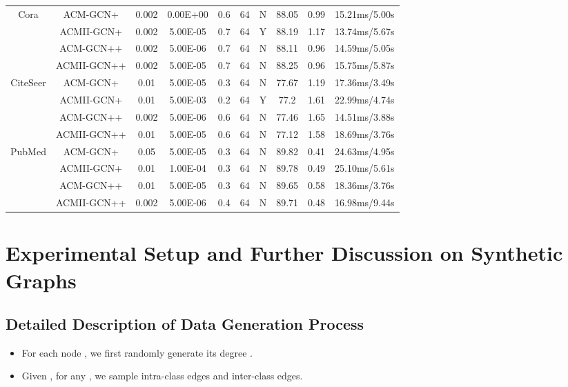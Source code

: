 \documentclass{article}
\newcommand{\0}{{\boldsymbol{0}}}
\newcommand{\6}{{\partial}}
\newcommand{\8}{{\infty}}
\newcommand{\4}{{\nabla}}
\begin{document}
\begin{table}[htbp]
{\begin{tabular}{c|c|cccccccc}
          \midrule
    \multirow{4}[0]{*}{{Cora}} & ACM-GCN+ & 0.002 & 0.00E+00 & 0.6   & 64    & N     & 88.05 & 0.99  & 15.21ms/5.00s \\
          & ACMII-GCN+ & 0.002 & 5.00E-05 & 0.7   & 64    & Y     & 88.19 & 1.17  & 13.74ms/5.67s \\
          & ACM-GCN++ & 0.002 & 5.00E-06 & 0.7   & 64    & N     & 88.11 & 0.96  & 14.59ms/5.05s \\
          & ACMII-GCN++ & 0.002 & 5.00E-05 & 0.7   & 64    & N     & 88.25 & 0.96  & 15.75ms/5.87s \\
          \midrule
    \multirow{4}[0]{*}{{CiteSeer}} & ACM-GCN+ & 0.01  & 5.00E-05 & 0.3   & 64    & N     & 77.67 & 1.19  & 17.36ms/3.49s \\
          & ACMII-GCN+ & 0.01  & 5.00E-03 & 0.2   & 64    & Y     & 77.2  & 1.61  & 22.99ms/4.74s \\
          & ACM-GCN++ & 0.002 & 5.00E-06 & 0.6   & 64    & N     & 77.46 & 1.65  & 14.51ms/3.88s \\
          & ACMII-GCN++ & 0.01  & 5.00E-05 & 0.6   & 64    & N     & 77.12 & 1.58  & 18.69ms/3.76s \\
          \midrule
    \multirow{4}[1]{*}{{PubMed}} & ACM-GCN+ & 0.05  & 5.00E-05 & 0.3   & 64    & N     & 89.82 & 0.41  & 24.63ms/4.95s \\
          & ACMII-GCN+ & 0.01  & 1.00E-04 & 0.3   & 64    & N     & 89.78 & 0.49  & 25.10ms/5.61s \\
          & ACM-GCN++ & 0.01  & 5.00E-05 & 0.3   & 64    & N     & 89.65 & 0.58  & 18.36ms/3.76s \\
          & ACMII-GCN++ & 0.002 & 5.00E-06 & 0.4   & 64    & N     & 89.71 & 0.48  & 16.98ms/9.44s \\
    \bottomrule
    \bottomrule
    \end{tabular}\label{tab:hyperparameters_acmgcn+_acmgcn++}}
\end{table} 
\clearpage

\section{Experimental Setup and Further Discussion on Synthetic Graphs}
\label{appendix:synthetic_setup_discussion}

\subsection{Detailed Description of Data Generation Process}
\begin{itemize}
    \item For each node , we first randomly generate its degree .
    \item Given , for any , we sample  intra-class edges and  inter-class edges.
\end{itemize}
\end{document}
